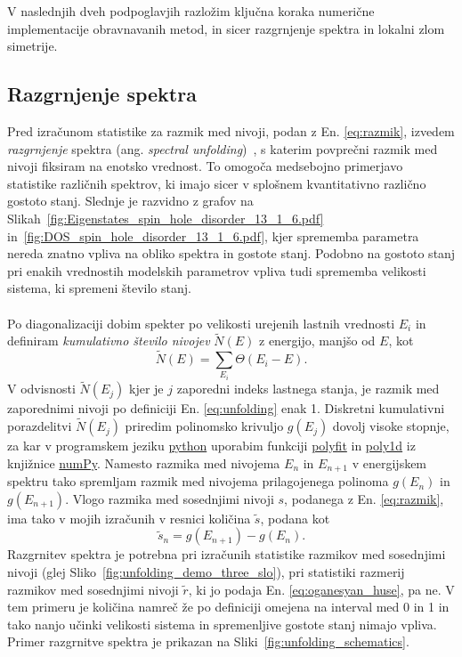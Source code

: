 \documentclass[10pt,a4paper]{article}
\begin{document}
V naslednjih dveh podpoglavjih razložim ključna koraka numerične implementacije obravnavanih metod, in sicer razgrnjenje spektra in lokalni zlom simetrije. 
\subsection{Razgrnjenje spektra}
Pred izračunom statistike za razmik med nivoji, podan z En. \eqref{eq:razmik}, izvedem \emph{razgrnjenje} spektra (ang. \emph{spectral unfolding})~\cite{abul2014unfolding}, s katerim povprečni razmik med nivoji fiksiram na enotsko vrednost. To omogoča medsebojno primerjavo statistike različnih spektrov, ki imajo sicer v splošnem kvantitativno različno gostoto stanj. Slednje je razvidno z grafov na Slikah~\ref{fig:Eigenstates_spin_hole_disorder_13_1_6.pdf} in~\ref{fig:DOS_spin_hole_disorder_13_1_6.pdf}, kjer sprememba parametra nereda znatno vpliva na obliko spektra in gostote stanj. Podobno na gostoto stanj pri enakih vrednostih modelskih parametrov vpliva tudi sprememba velikosti sistema, ki spremeni število stanj. \\\\
Po diagonalizaciji dobim spekter po velikosti urejenih lastnih vrednosti $E_i$ in definiram \emph{kumulativno število nivojev} $\tilde{N}(E)$ z energijo, manjšo od $E$, kot
\begin{equation}\label{eq:unfolding}
\tilde{N}(E)=\sum\limits_{E_i}\Theta(E_i-E).
\end{equation}
V odvisnosti $\tilde{N}(E_j)$ kjer je $j$ zaporedni indeks lastnega stanja, je razmik med zaporednimi nivoji po definiciji En. \eqref{eq:unfolding} enak 1. Diskretni kumulativni porazdelitvi $\tilde{N}(E_j)$ priredim polinomsko krivuljo $g(E_j)$ dovolj visoke stopnje, za kar v programskem jeziku \url{python} uporabim funkciji \url{polyfit} in \url{poly1d} iz knjižnice \url{numPy}. Namesto razmika med nivojema $E_n$ in $E_{n+1}$ v energijskem spektru tako spremljam razmik med nivojema prilagojenega polinoma $g(E_{n})$ in $g(E_{n+1})$. Vlogo razmika med sosednjimi nivoji $s$, podanega z En. \eqref{eq:razmik}, ima tako v mojih izračunih v resnici količina $\tilde{s}$, podana kot
$$
\tilde{s}_n=g(E_{n+1})-g(E_n).
$$
Razgrnitev spektra je potrebna pri izračunih statistike razmikov med sosednjimi nivoji (glej Sliko~\ref{fig:unfolding_demo_three_slo}), pri statistiki razmerij razmikov med sosednjimi nivoji $\tilde{r}$, ki jo podaja En. \eqref{eq:oganesyan_huse}, pa ne. V tem primeru je količina namreč že po definiciji omejena na interval med 0 in 1 in tako nanjo učinki velikosti sistema in spremenljive gostote stanj nimajo vpliva. Primer razgrnitve spektra je prikazan na Sliki~\ref{fig:unfolding_schematics}.
\end{document}
